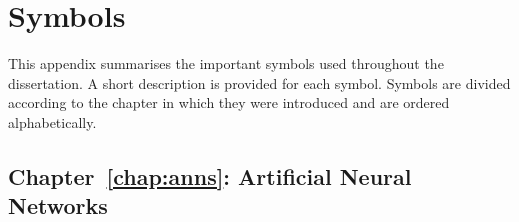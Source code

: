 \chapter{Symbols}
\label{app:symbols}

This appendix summarises the important symbols used throughout the dissertation. A short description is provided for each symbol. Symbols are divided according to the chapter in which they were introduced and are ordered alphabetically.

\section{Chapter~\ref{chap:anns}: Artificial Neural Networks}
\label{sec:symbols:anns}

\begin{description}


\end{description}
